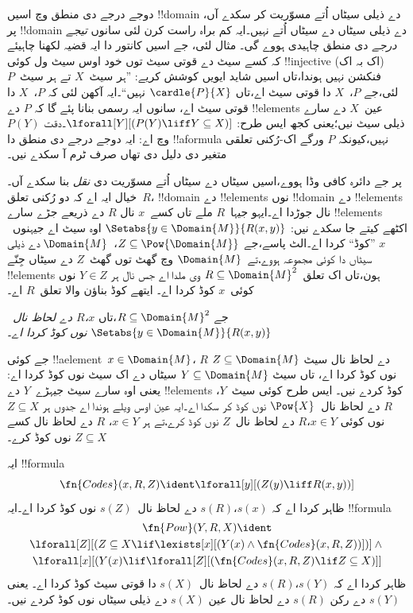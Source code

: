 \documentclass[../../../include/open-logic-section]{subfiles}
\begin{document}


\begin{explain}
دوجے درجے دی منطق وچ اسیں !!{domain} دے ذیلی سیٹاں اُتے مسوّریت کر
سکدے آں، پر !!{domain} دے ذیلی سیٹاں دے سیٹاں اُتے نہیں۔ایہ کم
براہ راست کرن لئی سانوں \emph{تیجے درجے} دی منطق چاہیدی ہووے گی۔
مثال لئی، جے اسیں کانتور دا ایہ قضیہ لکھنا چاہیئے کہ کسے سیٹ دے
قوتی سیٹ توں خود اوس سیٹ ول کوئی !!{injective} (اک بہ اک) فنکشن
نہیں ہوندا،تاں اسیں شاید ایویں کوشش کریے: ”ہر سیٹ~$X$ تے ہر
سیٹ~$P$ لئی،جے $P$،~$X$ دا قوتی سیٹ اے،تاں
$\cardle{P}{X}$ نہیں“۔ایہ آکھن لئی کہ $P$،~$X$ دا قوتی سیٹ اے،
سانوں ایہ رسمی بنانا پئے گا کہ $P$ دے !!{element}s عین~$X$ دے
سارے ذیلی سیٹ نیں؛یعنی کجھ ایس طرح:
$\lforall[Y][(P(Y) \liff Y \subseteq X)]$۔دقت $P(Y)$ وچ اے:
ایہ دوجے درجے دی منطق دا !!a{formula} نہیں،کیونکہ $P$ ورگے
اک-رُکنی تعلقی متغیر دی دلیل دی تھاں صرف ٹرم آ سکدے نیں۔

پر جے دائرہ کافی وڈا ہووے،اسیں سیٹاں دے سیٹاں اُتے مسوّریت دی
\emph{نقل} بنا سکدے آں۔خیال ایہ اے کہ دو رُکنی تعلق~$R$،
!!{domain} دے !!{element}s نوں !!{domain} دے !!{element}s نال
جوڑدا اے۔ایہو جیہا~$R$ ملے تاں کسے~$x$ نال $R$ دے ذریعے
جڑے سارے !!{element}s اکٹھے کیتے جا سکدے نیں:
$\Setabs{y \in \Domain{M}}{R(x,y)}$ اوہ سیٹ اے جیہنوں~$x$
”کوڈ“ کردا اے۔الٹ پاسے،جے
$Z \subseteq \Pow{\Domain{M}}$،~$\Domain{M}$ دے ذیلی سیٹاں دا
کوئی مجموعہ ہووے،تے~$\Domain{M}$ وچ گھٹ توں گھٹ~$Z$ دے سیٹاں
جِنّے !!{element}s ہون،تاں اک تعلق~$R \subseteq \Domain{M}^2$
وی ملدا اے جس نال ہر $Y \in Z$ نوں کوئی~$x$ کوڈ کردا اے۔
ایتھے کوڈ بناؤن والا تعلق~$R$ اے۔
\end{explain}

\begin{defn}
جے $R \subseteq \Domain{M}^2$،تاں
\emph{$x$،$R$ دے لحاظ نال~$\Setabs{y
  \in \Domain{M}}{R(x, y)}$ نوں کوڈ کردا اے}۔
\end{defn}

جے کوئی !!a{element}~$x \in \Domain{M}$،
$R$ دے لحاظ نال سیٹ $Z \subseteq \Domain{M}$ نوں کوڈ کردا اے،
تاں سیٹ $Y \subseteq \Domain{M}$ سیٹاں دے اک سیٹ نوں کوڈ کردا اے:
یعنی اوہ سارے سیٹ جیہڑے~$Y$ دے !!{element}s کوڈ کردے نیں۔ ایس طرح کوئی
سیٹ~$Y$،$R$ دے لحاظ نال~$\Pow{X}$ نوں کوڈ کر سکدا اے۔ایہ
عین اوس ویلے ہوندا اے جدوں ہر $Z \subseteq X$ نوں کوئی $x
\in Y$،$R$ دے لحاظ نال~$Z$ نوں کوڈ کرے،تے ہر $x \in Y$،
$R$ دے لحاظ نال کسے $Z \subseteq X$ نوں کوڈ کرے۔

\begin{prop}
ایہ !!{formula}
  \[
  \fn{Codes}(x, R, Z) \ident \lforall[y][(Z(y) \liff
    R(x, y))]
  \]
ظاہر کردا اے کہ $s(x)$،$s(R)$ دے لحاظ نال~$s(Z)$ نوں کوڈ
کردا اے۔ایہ !!{formula}
\begin{multline*}
  \fn{Pow}(Y, R, X) \ident \\
  \lforall[Z][(Z \subseteq X \lif \lexists[x][(Y(x) \land
    \fn{Codes}(x, R, Z))])] \land {} \\ \lforall[x][(Y(x) \lif
  \lforall[Z][(\fn{Codes}(x, R, Z) \lif Z \subseteq X)]]
\end{multline*}
ظاہر کردا اے کہ $s(Y)$،$s(R)$ دے لحاظ نال~$s(X)$ دا قوتی
سیٹ کوڈ کردا اے۔ یعنی $s(Y)$ دے رکن $s(R)$ دے لحاظ نال عین
$s(X)$ دے ذیلی سیٹاں نوں کوڈ کردے نیں۔
\end{prop}
\end{document}
